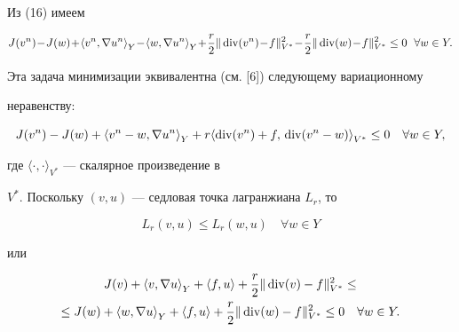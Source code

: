 \begin{pf} Из (16) имеем


\begin{equation}


J(v^{n})\! -\! J(w)\! +\! {\langle v^{n}, \nabla u^{n} \rangle}_{Y}\! - \!


{\langle w,\nabla u^{n} \rangle}_{Y}\! +\!


\frac{r}{2}\|\Div (v^{n})\! -\! f\|^{2}_{V^{*}}\! - \!


\frac{r}{2}\|\Div (w)\! -\! f\|^{2}_{V^{*}} 


\le 0 \ \; \forall w \in Y.


\end{equation}


Эта задача минимизации эквивалентна (см. [6]) следующему вариационному 


неравенству:


\begin{equation}


J(v^{n}) - J(w) + {\langle v^{n}-w,\nabla u^{n} \rangle}_{Y} +


r {\langle \Div (v^{n}) + f,\, \Div (v^{n}- w) \rangle}_{V^{*}} \le 0 


\quad \forall w \in Y,


\end{equation}


где ${\langle \cdot,\cdot \rangle }_{V^{*}}$ --- скалярное произведение в 


$V^{*}$. Поскольку $(v,u)$ --- седловая точка лагранжиана $L_{r}$, то


$$


L_{r}(v,u) \le L_{r}(w,u) \quad \forall w \in Y


$$ 


или


\begin{multline*}


J(v) + {\langle v, \nabla u \rangle}_{Y} + 


{\langle f,u \rangle} + \frac{r}{2} 


\|\Div (v) - f\|^{2}_{V^{*}} \le \\


\le J(w) + {\langle w,\nabla u \rangle}_{Y} + {\langle f, u \rangle} +


\frac{r}{2}\|\Div (w) - f\|^{2}_{V^{*}} 


\le 0 \quad \forall w \in Y.


\end{multline*}



\end{pf}
